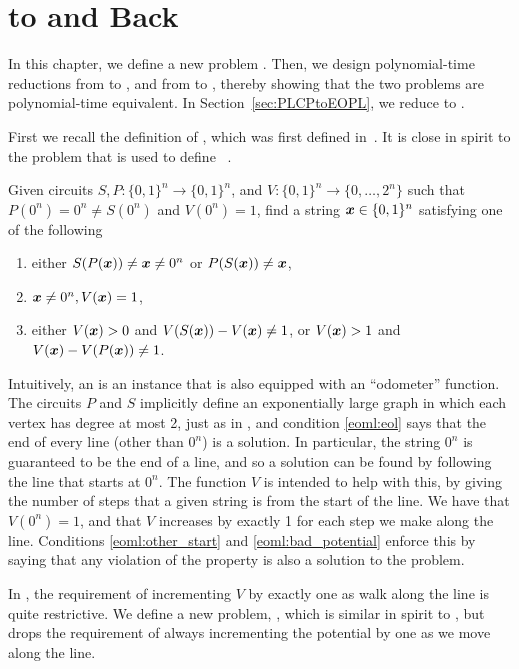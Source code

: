\chapter{\EOML to \EOPL and Back}
\label{sec:EOMLtoEOPL}

In this chapter, we define a new problem \EOPL.
Then, we design polynomial-time reductions from \EOML to \EOPL, and
from \EOPL to \EOML, thereby showing that the two problems 
are polynomial-time equivalent. In Section~\ref{sec:PLCPtoEOPL},
we reduce \PLCP to \EOPL.

First we recall the definition of \EOML, which was
first defined in~\cite{hubavcek2017hardness}.
It is close in spirit to the problem \EOL that is used
to define \PPAD~\cite{papadimitriou1994complexity}. 

\begin{definition}
Given circuits $S,P: \{0,1\}^n \rightarrow \{0,1\}^n$, and $V:\{0,1\}^n\rightarrow \{0,\dots, 2^n\}$ such that $P(0^n) =0^n\neq S(0^n)$ and $V(0^n)=1$, find a string $\mbox{\boldmath $x$} \in \{0,1\}^n$ satisfying one of the following 
\begin{enumerate}[label=(T\arabic*)]
\item either $S(P(\mbox{\boldmath $x$}))\neq \mbox{\boldmath $x$} \neq 0^n$ or $P(S(\mbox{\boldmath $x$}))\neq \mbox{\boldmath $x$}$, \label{eoml:eol}
\item $\mbox{\boldmath $x$}\neq 0^n, V(\mbox{\boldmath $x$})=1$, \label{eoml:other_start}
\item either $V(\mbox{\boldmath $x$})>0$ and $V(S(\mbox{\boldmath $x$}))-V(\mbox{\boldmath $x$})\neq 1$, or $V(\mbox{\boldmath $x$})>1$ and $V(\mbox{\boldmath $x$})-V(P(\mbox{\boldmath $x$}))\neq 1$. \label{eoml:bad_potential}
\end{enumerate}
\end{definition}
Intuitively, an \EOML is an \EOL instance that is also equipped with an
``odometer'' function. The circuits $P$ and $S$ implicitly define an
exponentially large graph in which each vertex has degree at most 2, just as in \EOL, and condition \ref{eoml:eol} says that the end of
every line (other than $0^n$) is a solution.
In particular, the string 
$0^n$ is guaranteed to be the end of a line, and so a solution can be found by
following the line that starts at $0^n$.
 The function $V$ is intended to help with this, by giving the number of steps
that a given string is from the start of the line. We have that $V(0^n) = 1$,
and that $V$ increases by exactly 1 for each step we make along the line.
Conditions \ref{eoml:other_start} and \ref{eoml:bad_potential} enforce this by saying that any violation of the property
is also a solution to the problem. 

In \EOML, the requirement of incrementing $V$ by exactly one as walk along the
line is quite restrictive. We define a new problem, \EOPL,  which is similar in
spirit to \EOL, but drops the requirement of always incrementing the potential
by one as we move along the line.

